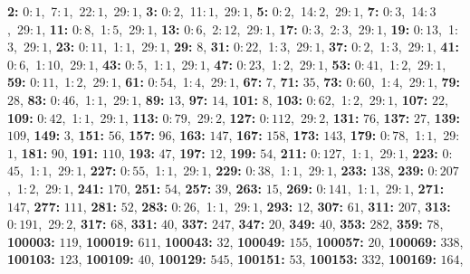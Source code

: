 \textsf{\bfseries 2:} 0:\,$1$,\ 7:\,$1$,\ 22:\,$1$,\ 29:\,$1$, \textsf{\bfseries 3:} 0:\,$2$,\ 11:\,$1$,\ 29:\,$1$, \textsf{\bfseries 5:} 0:\,$2$,\ 14:\,$2$,\ 29:\,$1$, \textsf{\bfseries 7:} 0:\,$3$,\ 14:\,$3$,\ 29:\,$1$, \textsf{\bfseries 11:} 0:\,$8$,\ 1:\,$5$,\ 29:\,$1$, \textsf{\bfseries 13:} 0:\,$6$,\ 2:\,$12$,\ 29:\,$1$, \textsf{\bfseries 17:} 0:\,$3$,\ 2:\,$3$,\ 29:\,$1$, \textsf{\bfseries 19:} 0:\,$13$,\ 1:\,$3$,\ 29:\,$1$, \textsf{\bfseries 23:} 0:\,$11$,\ 1:\,$1$,\ 29:\,$1$, \textsf{\bfseries 29:} $8$, \textsf{\bfseries 31:} 0:\,$22$,\ 1:\,$3$,\ 29:\,$1$, \textsf{\bfseries 37:} 0:\,$2$,\ 1:\,$3$,\ 29:\,$1$, \textsf{\bfseries 41:} 0:\,$6$,\ 1:\,$10$,\ 29:\,$1$, \textsf{\bfseries 43:} 0:\,$5$,\ 1:\,$1$,\ 29:\,$1$, \textsf{\bfseries 47:} 0:\,$23$,\ 1:\,$2$,\ 29:\,$1$, \textsf{\bfseries 53:} 0:\,$41$,\ 1:\,$2$,\ 29:\,$1$, \textsf{\bfseries 59:} 0:\,$11$,\ 1:\,$2$,\ 29:\,$1$, \textsf{\bfseries 61:} 0:\,$54$,\ 1:\,$4$,\ 29:\,$1$, \textsf{\bfseries 67:} $7$, \textsf{\bfseries 71:} $35$, \textsf{\bfseries 73:} 0:\,$60$,\ 1:\,$4$,\ 29:\,$1$, \textsf{\bfseries 79:} $28$, \textsf{\bfseries 83:} 0:\,$46$,\ 1:\,$1$,\ 29:\,$1$, \textsf{\bfseries 89:} $13$, \textsf{\bfseries 97:} $14$, \textsf{\bfseries 101:} $8$, \textsf{\bfseries 103:} 0:\,$62$,\ 1:\,$2$,\ 29:\,$1$, \textsf{\bfseries 107:} $22$, \textsf{\bfseries 109:} 0:\,$42$,\ 1:\,$1$,\ 29:\,$1$, \textsf{\bfseries 113:} 0:\,$79$,\ 29:\,$2$, \textsf{\bfseries 127:} 0:\,$112$,\ 29:\,$2$, \textsf{\bfseries 131:} $76$, \textsf{\bfseries 137:} $27$, \textsf{\bfseries 139:} $109$, \textsf{\bfseries 149:} $3$, \textsf{\bfseries 151:} $56$, \textsf{\bfseries 157:} $96$, \textsf{\bfseries 163:} $147$, \textsf{\bfseries 167:} $158$, \textsf{\bfseries 173:} $143$, \textsf{\bfseries 179:} 0:\,$78$,\ 1:\,$1$,\ 29:\,$1$, \textsf{\bfseries 181:} $90$, \textsf{\bfseries 191:} $110$, \textsf{\bfseries 193:} $47$, \textsf{\bfseries 197:} $12$, \textsf{\bfseries 199:} $54$, \textsf{\bfseries 211:} 0:\,$127$,\ 1:\,$1$,\ 29:\,$1$, \textsf{\bfseries 223:} 0:\,$45$,\ 1:\,$1$,\ 29:\,$1$, \textsf{\bfseries 227:} 0:\,$55$,\ 1:\,$1$,\ 29:\,$1$, \textsf{\bfseries 229:} 0:\,$38$,\ 1:\,$1$,\ 29:\,$1$, \textsf{\bfseries 233:} $138$, \textsf{\bfseries 239:} 0:\,$207$,\ 1:\,$2$,\ 29:\,$1$, \textsf{\bfseries 241:} $170$, \textsf{\bfseries 251:} $54$, \textsf{\bfseries 257:} $39$, \textsf{\bfseries 263:} $15$, \textsf{\bfseries 269:} 0:\,$141$,\ 1:\,$1$,\ 29:\,$1$, \textsf{\bfseries 271:} $147$, \textsf{\bfseries 277:} $111$, \textsf{\bfseries 281:} $52$, \textsf{\bfseries 283:} 0:\,$26$,\ 1:\,$1$,\ 29:\,$1$, \textsf{\bfseries 293:} $12$, \textsf{\bfseries 307:} $61$, \textsf{\bfseries 311:} $207$, \textsf{\bfseries 313:} 0:\,$191$,\ 29:\,$2$, \textsf{\bfseries 317:} $68$, \textsf{\bfseries 331:} $40$, \textsf{\bfseries 337:} $247$, \textsf{\bfseries 347:} $20$, \textsf{\bfseries 349:} $40$, \textsf{\bfseries 353:} $282$, \textsf{\bfseries 359:} $78$, \textsf{\bfseries 100003:} $119$, \textsf{\bfseries 100019:} $611$, \textsf{\bfseries 100043:} $32$, \textsf{\bfseries 100049:} $155$, \textsf{\bfseries 100057:} $20$, \textsf{\bfseries 100069:} $338$, \textsf{\bfseries 100103:} $123$, \textsf{\bfseries 100109:} $40$, \textsf{\bfseries 100129:} $545$, \textsf{\bfseries 100151:} $53$, \textsf{\bfseries 100153:} $332$, \textsf{\bfseries 100169:} $164$, 